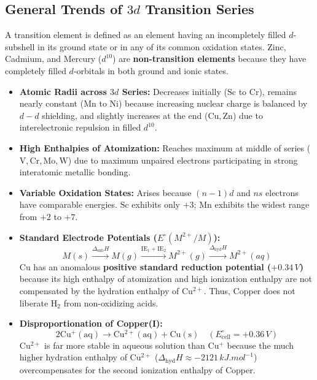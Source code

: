 \documentclass[10pt,twoside,openright]{book}
\begin{document}
\subsection{General Trends of $3d$ Transition Series}
A transition element is defined as an element having an incompletely filled $d$-subshell in its ground state or in any of its common oxidation states. Zinc, Cadmium, and Mercury ($d^{10}$) are \textbf{non-transition elements} because they have completely filled $d$-orbitals in both ground and ionic states.
\begin{itemize}
  \item \textbf{Atomic Radii across $3d$ Series:} Decreases initially ($\mathrm{Sc}$ to $\mathrm{Cr}$), remains nearly constant ($\mathrm{Mn}$ to $\mathrm{Ni}$) because increasing nuclear charge is balanced by $d-d$ shielding, and slightly increases at the end ($\mathrm{Cu, Zn}$) due to interelectronic repulsion in filled $d^{10}$.
  \item \textbf{High Enthalpies of Atomization:} Reaches maximum at middle of series ($\mathrm{V, Cr, Mo, W}$) due to maximum unpaired electrons participating in strong interatomic metallic bonding.
  \item \textbf{Variable Oxidation States:} Arises because $(n-1)d$ and $ns$ electrons have comparable energies. $\mathrm{Sc}$ exhibits only $+3$; $\mathrm{Mn}$ exhibits the widest range from $+2$ to $+7$.
  \item \textbf{Standard Electrode Potentials ($E^\circ(M^{2+}/M)$):}
  \begin{equation}
    M(s) \xrightarrow{\Delta_{\text{sub}} H} M(g) \xrightarrow{\text{IE}_1 + \text{IE}_2} M^{2+}(g) \xrightarrow{\Delta_{\text{hyd}} H} M^{2+}(aq)
  \end{equation}
  $\mathbf{\mathrm{Cu}}$ has an anomalous \textbf{positive standard reduction potential ($+0.34\,\si{V}$)} because its high enthalpy of atomization and high ionization enthalpy are not compensated by the hydration enthalpy of $\mathrm{Cu^{2+}}$. Thus, Copper does not liberate $\mathrm{H_2}$ from non-oxidizing acids.
  \item \textbf{Disproportionation of Copper(I):}
  \begin{equation}
    2\mathrm{Cu^+(aq)} \longrightarrow \mathrm{Cu^{2+}(aq)} + \mathrm{Cu(s)} \quad (E^\circ_{\text{cell}} = +0.36\,\si{V})
  \end{equation}
  $\mathrm{Cu^{2+}}$ is far more stable in aqueous solution than $\mathrm{Cu^+}$ because the much higher hydration enthalpy of $\mathrm{Cu^{2+}}$ ($\Delta_{\text{hyd}} H \approx -2121\,\si{kJ.mol^{-1}}$) overcompensates for the second ionization enthalpy of Copper.

\end{itemize}
\end{document}

